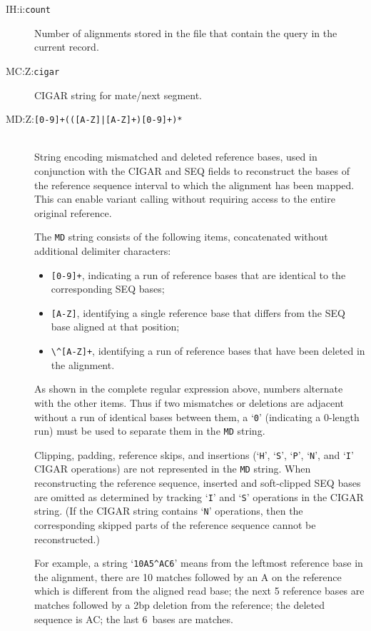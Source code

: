 \documentclass[10pt]{article}
\newcommand{\tagvalue}[1]{{\tt #1}}
\newcommand{\tagregex}[1]{{\tt #1}}
\begin{document}
\begin{description}
\item[IH:i:\tagvalue{count}]
Number of alignments stored in the file that contain the query in the current
record.

\item[MC:Z:\tagvalue{cigar}]
CIGAR string for mate/next segment.

\item[MD:Z:\tagregex{[0-9]+(([A-Z]|[A-Z]+)[0-9]+)*}]
\hfill\\
String encoding mismatched and deleted reference bases, used in conjunction with the {\sf CIGAR} and {\sf SEQ} fields to reconstruct the bases of the reference sequence interval to which the alignment has been mapped.
This can enable variant calling without requiring access to the entire original reference.

The {\tt MD} string consists of the following items, concatenated without additional delimiter characters:
\begin{itemize}
\item \verb"[0-9]+", indicating a run of reference bases that are identical to the corresponding {\sf SEQ} bases;
\item \verb"[A-Z]", identifying a single reference base that differs from the {\sf SEQ} base aligned at that position;
\item \verb"\^[A-Z]+", identifying a run of reference bases that have been deleted in the alignment.
\end{itemize}

As shown in the complete regular expression above, numbers alternate with the other items.
Thus if two mismatches or deletions are adjacent without a run of identical bases between them, a `{\tt 0}' (indicating a 0-length run) must be used to separate them in the {\tt MD} string.

Clipping, padding, reference skips, and insertions (`{\tt H}', `{\tt S}', `{\tt P}', `{\tt N}', and `{\tt I}' {\sf CIGAR} operations) are not represented in the {\tt MD} string.
When reconstructing the reference sequence, inserted and soft-clipped {\sf SEQ} bases are omitted as determined by tracking `{\tt I}' and `{\tt S}' operations in the {\sf CIGAR} string.
(If the {\sf CIGAR} string contains `{\tt N}' operations, then the corresponding skipped parts of the reference sequence cannot be reconstructed.)

For example, a string `\verb"10A5^AC6"' means
from the leftmost reference base in the alignment, there are 10 matches
followed by an A on the reference which is different from the aligned read
base; the next 5 reference bases are matches followed by a 2bp deletion from
the reference; the deleted sequence is AC; the last 6~bases are matches.


\end{description}
\end{document}
